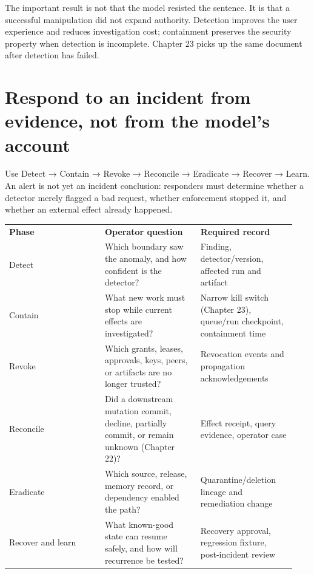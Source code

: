 The important result is not that the model resisted the sentence. It is that a successful manipulation did not expand authority. Detection improves the user experience and reduces investigation cost; containment preserves the security property when detection is incomplete. Chapter 23 picks up the same document after detection has failed.\par

\section{Respond to an incident from evidence, not from the model's account}

Use Detect → Contain → Revoke → Reconcile → Eradicate → Recover → Learn. An alert is not yet an incident conclusion: responders must determine whether a detector merely flagged a bad request, whether enforcement stopped it, and whether an external effect already happened.\par

\BookTableStart
\small
\begin{tabular}{@{}Y{0.3133\linewidth}Y{0.3133\linewidth}Y{0.3133\linewidth}@{}}
\color{white}\bfseries \textbf{Phase} & \color{white}\bfseries \textbf{Operator question} & \color{white}\bfseries \textbf{Required record} \\
Detect & Which boundary saw the anomaly, and how confident is the detector? & Finding, detector/version, affected run and artifact \\
Contain & What new work must stop while current effects are investigated? & Narrow kill switch (Chapter 23), queue/run checkpoint, containment time \\
Revoke & Which grants, leases, approvals, keys, peers, or artifacts are no longer trusted? & Revocation events and propagation acknowledgements \\
Reconcile & Did a downstream mutation commit, decline, partially commit, or remain unknown (Chapter 22)? & Effect receipt, query evidence, operator case \\
Eradicate & Which source, release, memory record, or dependency enabled the path? & Quarantine/deletion lineage and remediation change \\
Recover and learn & What known-good state can resume safely, and how will recurrence be tested? & Recovery approval, regression fixture, post-incident review \\
\end{tabular}
\BookTableEnd

